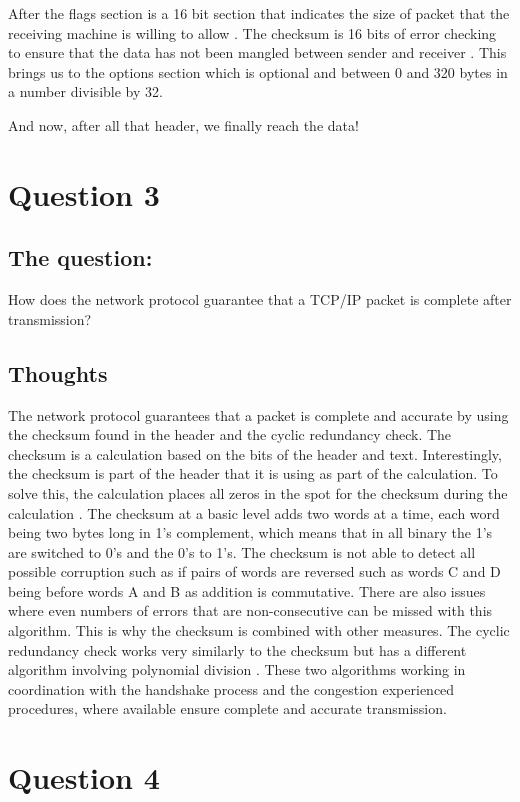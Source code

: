 \documentclass[a4paper]{article}
\begin{document}
    After the flags section is a 16 bit section that indicates the size of packet that the receiving machine is willing to allow \cite{network}.  The checksum is 16 bits of error checking to ensure that the data has not been mangled between sender and receiver \cite{tcpwiki}.  This brings us to the options section which is optional and between 0 and 320 bytes in a number divisible by 32.
    
    And now, after all that header, we finally reach the data!

\section{Question 3}
\label{sec:question 3}
\subsection{The question:}
How does the network protocol guarantee that a TCP/IP packet is complete after transmission?
\subsection{Thoughts}
The network protocol guarantees that a packet is complete and accurate by using the checksum found in the header and the cyclic redundancy check.  The checksum is a calculation based on the bits of the header and text.  Interestingly, the checksum is part of the header that it is using as part of the calculation.  To solve this, the calculation places all zeros in the spot for the checksum during the calculation \cite{checksum}.  The checksum at a basic level adds two words at a time, each word being two bytes long in 1's complement, which means that in all binary the 1's are switched to 0's and the 0's to 1's.  The checksum is not able to detect all possible corruption such as if pairs of words are reversed such as words C and D being before words A and B as addition is commutative.  There are also issues where even numbers of errors that are non-consecutive can be missed with this algorithm.  This is why the checksum is combined with other measures.  The cyclic redundancy check works very similarly to the checksum but has a different algorithm involving polynomial division \cite{crc}.  These two algorithms working in coordination with the handshake process and the congestion experienced procedures, where available ensure complete and accurate transmission.

\section{Question 4}
\label{sec:question 4}
\end{document}
